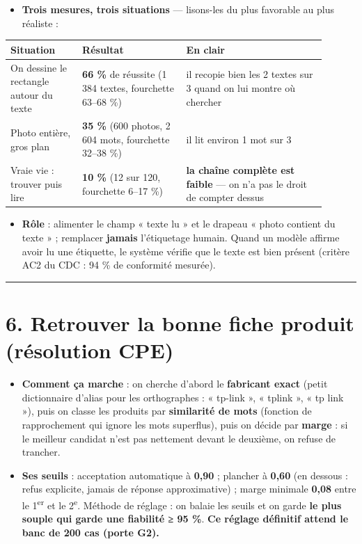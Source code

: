 \documentclass[11pt,a4paper]{article}
\begin{document}
\begin{itemize}  \item \textbf{Trois mesures, trois situations} — lisons-les du plus favorable au plus réaliste :
\end{itemize}

\sloppy
\begin{longtable}{|p{0.209\linewidth}|p{0.295\linewidth}|p{0.392\linewidth}|}
\hline
\textbf{Situation} & \textbf{Résultat} & \textbf{En clair} \\ \hline
\endhead
On dessine le rectangle autour du texte & \textbf{66 \%} de réussite (1 384 textes, fourchette 63–68 \%) & il recopie bien les 2 textes sur 3 quand on lui montre où chercher \\ \hline
Photo entière, gros plan & \textbf{35 \%} (600 photos, 2 604 mots, fourchette 32–38 \%) & il lit environ 1 mot sur 3 \\ \hline
Vraie vie : trouver puis lire & \textbf{10 \%} (12 sur 120, fourchette 6–17 \%) & \textbf{la chaîne complète est faible} — on n'a pas le droit de compter dessus \\ \hline
\end{longtable}
\begin{itemize}  \item \textbf{Rôle} : alimenter le champ « texte lu » et le drapeau « photo contient du texte » ; remplacer \textbf{jamais} l'étiquetage humain. Quand un modèle affirme avoir lu une étiquette, le système vérifie que le texte est bien présent (critère AC2 du CDC : 94 \% de conformité mesurée).
\end{itemize}

\medskip\hrule\medskip
\section*{6. Retrouver la bonne fiche produit (résolution CPE)}
\begin{itemize}  \item \textbf{Comment ça marche} : on cherche d'abord le \textbf{fabricant exact} (petit dictionnaire d'alias pour les orthographes : « tp-link », « tplink », « tp link »), puis on classe les produits par \textbf{similarité de mots} (fonction de rapprochement qui ignore les mots superflus), puis on décide par \textbf{marge} : si le meilleur candidat n'est pas nettement devant le deuxième, on refuse de trancher.
\end{itemize}

\begin{itemize}  \item \textbf{Ses seuils} : acceptation automatique à \textbf{0,90} ; plancher à \textbf{0,60} (en dessous : refus explicite, jamais de réponse approximative) ; marge minimale \textbf{0,08} entre le 1\textsuperscript{er} et le 2\textsuperscript{e}. Méthode de réglage : on balaie les seuils et on garde \textbf{le plus souple qui garde une fiabilité ≥ 95 \%}. \textbf{Ce réglage définitif attend le banc de 200 cas (porte G2).}
\end{itemize}
\end{document}
